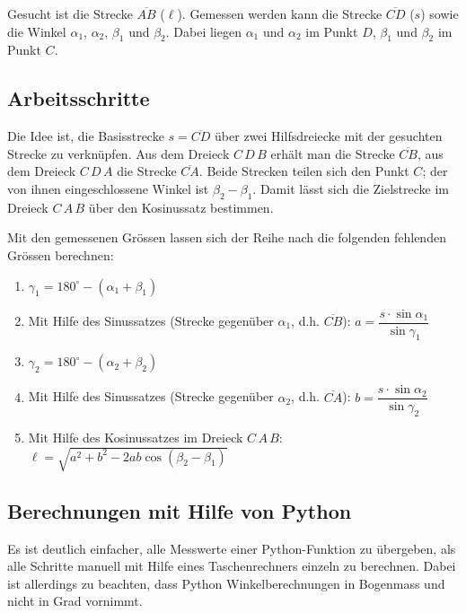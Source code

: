 \documentclass[
  nswissgerman,
  a4paper,
  DIV=11,
  numbers=noendperiod,
  ngerman]{scrreprt}
\providecommand{\tightlist}{%
  \setlength{\itemsep}{0pt}\setlength{\parskip}{0pt}}
\begin{document}
Gesucht ist die Strecke \(\overline{AB}\) (\(\ell\)). Gemessen werden
kann die Strecke \(\overline{CD}\) (\(s\)) sowie die Winkel
\(\alpha_1\), \(\alpha_2\), \(\beta_1\) und \(\beta_2\). Dabei liegen
\(\alpha_1\) und \(\alpha_2\) im Punkt \(D\), \(\beta_1\) und
\(\beta_2\) im Punkt \(C\).

\subsection{Arbeitsschritte}\label{arbeitsschritte}

Die Idee ist, die Basisstrecke \(s = \overline{CD}\) über zwei
Hilfsdreiecke mit der gesuchten Strecke zu verknüpfen. Aus dem Dreieck
\(C\,D\,B\) erhält man die Strecke \(\overline{CB}\), aus dem Dreieck
\(C\,D\,A\) die Strecke \(\overline{CA}\). Beide Strecken teilen sich
den Punkt \(C\); der von ihnen eingeschlossene Winkel ist
\(\beta_2 - \beta_1\). Damit lässt sich die Zielstrecke im Dreieck
\(C\,A\,B\) über den Kosinussatz bestimmen.

Mit den gemessenen Grössen lassen sich der Reihe nach die folgenden
fehlenden Grössen berechnen:

\begin{enumerate}
\def\labelenumi{\arabic{enumi}.}
\tightlist
\item
  \(\gamma_1 = 180^{\circ} - (\alpha_1 + \beta_1)\)
\item
  Mit Hilfe des Sinussatzes (Strecke gegenüber \(\alpha_1\), d.h.
  \(\overline{CB}\)):
  \(a = \dfrac{s \cdot \sin \alpha_1}{\sin \gamma_1}\)
\item
  \(\gamma_2 = 180^{\circ} - (\alpha_2 + \beta_2)\)
\item
  Mit Hilfe des Sinussatzes (Strecke gegenüber \(\alpha_2\), d.h.
  \(\overline{CA}\)):
  \(b = \dfrac{s \cdot \sin \alpha_2}{\sin \gamma_2}\)
\item
  Mit Hilfe des Kosinussatzes im Dreieck \(C\,A\,B\):
  \(\ell =\sqrt{a^2 + b^2 - 2ab \cos (\beta_2 - \beta_1)}\)
\end{enumerate}

\subsection{Berechnungen mit Hilfe von
Python}\label{berechnungen-mit-hilfe-von-python}

Es ist deutlich einfacher, alle Messwerte einer Python-Funktion zu
übergeben, als alle Schritte manuell mit Hilfe eines Taschenrechners
einzeln zu berechnen. Dabei ist allerdings zu beachten, dass Python
Winkelberechnungen in Bogenmass und nicht in Grad vornimmt.
\end{document}
